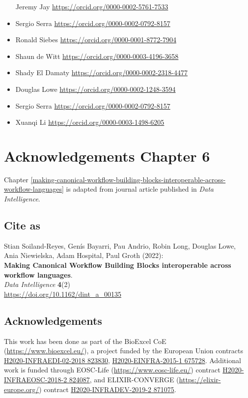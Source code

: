 \begin{itemize}
  Jeremy Jay \url{https://orcid.org/0000-0002-5761-7533}
\item
  Sergio Serra \url{https://orcid.org/0000-0002-0792-8157}
\item
  Ronald Siebes \url{https://orcid.org/0000-0001-8772-7904}
\item
  Shaun de Witt \url{https://orcid.org/0000-0003-4196-3658}
\item
  Shady El Damaty \url{https://orcid.org/0000-0002-2318-4477}
\item
  Douglas Lowe \url{https://orcid.org/0000-0002-1248-3594}
\item
  Sergio Serra \url{https://orcid.org/0000-0002-0792-8157}
\item
  Xuanqi Li \url{https://orcid.org/0000-0003-1498-6205}
\end{itemize}


\section{Acknowledgements Chapter 6}

Chapter \vref{making-canonical-workflow-building-blocks-interoperable-across-workflow-languages} is adapted from journal article published in \emph{Data Intelligence}.

\subsection*{Cite as}

Stian Soiland-Reyes, Genís Bayarri, Pau Andrio, Robin Long, Douglas
Lowe, Ania Niewielska, Adam Hospital, Paul Groth (2022):\\
\textbf{Making Canonical Workflow Building Blocks interoperable across
workflow languages}.\\
\emph{Data Intelligence} \textbf{4}(2)\\
\url{https://doi.org/10.1162/dint_a_00135}

\hypertarget{acknowledgements-3}{%
\subsection*{Acknowledgements}}

This work has been done as part of the BioExcel CoE
(\url{https://www.bioexcel.eu/}), a project funded by the European Union
contracts
\href{https://cordis.europa.eu/project/id/823830}{H2020-INFRAEDI-02-2018
823830},
\href{https://cordis.europa.eu/project/id/675728}{H2020-EINFRA-2015-1
675728}. Additional work is funded through EOSC-Life
(\url{https://www.eosc-life.eu/}) contract
\href{https://cordis.europa.eu/project/id/824087}{H2020-INFRAEOSC-2018-2
824087}, and ELIXIR-CONVERGE (\url{https://elixir-europe.org/}) contract
\href{https://cordis.europa.eu/project/id/871075}{H2020-INFRADEV-2019-2
871075}.


